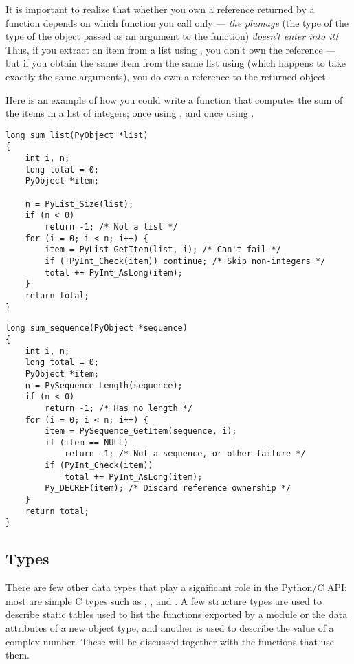 \documentclass{manual}
\begin{document}
It is important to realize that whether you own a reference returned 
by a function depends on which function you call only --- \emph{the
plumage} (the type of the type of the object passed as an
argument to the function) \emph{doesn't enter into it!}  Thus, if you 
extract an item from a list using , you
don't own the reference --- but if you obtain the same item from the
same list using  (which happens to
take exactly the same arguments), you do own a reference to the
returned object.

Here is an example of how you could write a function that computes the
sum of the items in a list of integers; once using 
, and once using
.

\begin{verbatim}
long sum_list(PyObject *list)
{
    int i, n;
    long total = 0;
    PyObject *item;

    n = PyList_Size(list);
    if (n < 0)
        return -1; /* Not a list */
    for (i = 0; i < n; i++) {
        item = PyList_GetItem(list, i); /* Can't fail */
        if (!PyInt_Check(item)) continue; /* Skip non-integers */
        total += PyInt_AsLong(item);
    }
    return total;
}
\end{verbatim}

\begin{verbatim}
long sum_sequence(PyObject *sequence)
{
    int i, n;
    long total = 0;
    PyObject *item;
    n = PySequence_Length(sequence);
    if (n < 0)
        return -1; /* Has no length */
    for (i = 0; i < n; i++) {
        item = PySequence_GetItem(sequence, i);
        if (item == NULL)
            return -1; /* Not a sequence, or other failure */
        if (PyInt_Check(item))
            total += PyInt_AsLong(item);
        Py_DECREF(item); /* Discard reference ownership */
    }
    return total;
}
\end{verbatim}


\subsection{Types \label{types}}

There are few other data types that play a significant role in 
the Python/C API; most are simple C types such as , 
,  and .  A few structure types 
are used to describe static tables used to list the functions exported 
by a module or the data attributes of a new object type, and another
is used to describe the value of a complex number.  These will 
be discussed together with the functions that use them.
\end{document}
